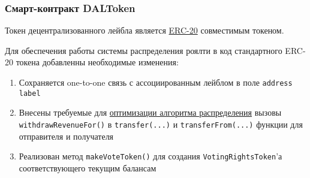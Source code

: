 \documentclass[12pt]{report}
\def\code#1{\colorbox{light-gray}{\texttt{#1}}}
\begin{document}
\subsubsection{Смарт-контракт DALToken}
\label{tech-apps-dal-token}
\begin{multicols}{2}
Токен децентрализованного лейбла является \hyperref[tech-blockchain-contracts]{ERC-20} совместимым токеном.

Для обеспечения работы системы распределения роялти в код стандартного ERC-20 токена добавленны необходимые изменения:
\begin{enumerate}
	\item Сохраняется one-to-one связь с ассоциированным лейблом в поле \code{address label}\vfill\null\columnbreak
	\item Внесены требуемые для \hyperref[tech-apps-dal-royalty-optimization]{оптимизации алгоритма распределения} вызовы \code{withdrawRevenueFor()} в \code{transfer(...)} и \code{transferFrom(...)} функции для отправителя и получателя
	\item Реализован метод \code{makeVoteToken()} для создания \code{VotingRightsToken}'а соответствующего текущим балансам
\end{enumerate}
\end{multicols}
\end{document}
